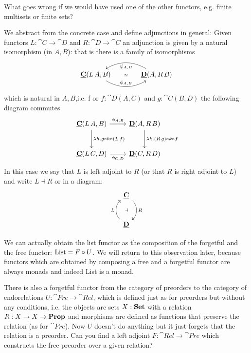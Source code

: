 \begin{question}
  What goes wrong if we would have used one of the other functors, e.g. finite multisets or finite sets?
\end{question}

We abstract from the concrete case and define adjunctions in general: Given functors $L : \cat{C} \to \cat{D}$ and $R : \cat{D} \to \cat{C}$ an adjunction is given by a natural isomorphism (in $A,B$): that is there is a family of isomorphisms 
\[\begin{tikzcd}[column sep = large]
\cat{C}(L\,A,B) \arrow[r,"\phi_{A,B}",bend right,"\cong" above=11] & \cat{D}(A,R\,B) \arrow[l,"\psi_{A,B}",bend right]
\end{tikzcd}\]
which is natural in $A,B$,i.e. f or $f:\cat{D}(A,C)$ and $g : \cat{C}(B,D)$ the following diagram commutes
\[\begin{tikzcd}[row sep = large]
    \cat{C}(L\,A,B) \arrow[r,"\phi_{A,B}"] \arrow[d,"\lambda h. g\circ h \circ (L\,f)"] & \cat{D}(A,R\,B)  \arrow[d,"\lambda k. (R\,g)\circ k \circ f"] \\
    \cat{C}(L\,C,D) \arrow[r,"\phi_{C,D}" below]  & \cat{D}(C,R\,D)  
\end{tikzcd}\]
In this case we say that $L$ is left adjoint to $R$ (or that $R$ is right adjoint to $L$) and write $L \dashv R$ or in a diagram:
\[\begin{tikzcd}[row sep=large]
\cat{C} \arrow[d,bend left = 50,"R" right,"\dashv" left = 10] \\ 
\cat{D} \arrow[u,bend left = 50,"L" left, ]
\end{tikzcd}\]

We can actually obtain the list functor as the composition of the forgetful and the free functor: $\mathrm{List} = F \circ U$. We will return to this observation later, because functors which are obtained by composing a free and a forgetful functor are always monads and indeed List is a monad.

\begin{Exercise}
\label{ex:free-preorder}
  There is also a forgetful functor from the category of preorders to the category of endorelations $U : \cat{Pre} \to \cat{Rel}$, which is defined just as for preorders but without any conditions, i.e. the objects are sets $X:\mathbf{Set}$ with a relation $R : X\to X\to\mathbf{Prop}$ and morphisms are defined as functions that preserve the relation (as for $\cat{Pre}$). Now $U$ doesn't do anything but it just forgets that the relation is a preorder. Can you find a left adjoint $F : \cat{Rel} \to \cat{Pre}$ which constructs the free preorder over a given relation?
\end{Exercise}

